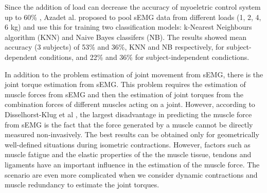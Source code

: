 \documentclass[letterpaper, 10 pt, conference]{ieeeconf}  %
\begin{document}
Since the addition of load can decrease the accuracy of myoeletric control system up to 60\% \cite{Al-Timemy6610859}, Azadet al. \cite{Azab8037374} proposed to pool sEMG data from different loads (1, 2, 4, 6 kg) and use this for training two classification models: k-Nearest Neighbours algorithm (KNN) and Naive Bayes classifers (NB). The results showed mean accuracy (3 subjects) of 53\% and 36\%, KNN and NB respectively, for subject-dependent conditions, and 22\% and 36\% for subject-independent condictions.

In addition to the problem estimation of joint movement from sEMG, there is the joint torque estimation from sEMG. This problem requires the estimation of muscle forces from sEMG and then the estimation of joint torques from the combination forces of different muscles acting on a joint. However, according to Disselhorst-Klug et al \cite{Disselhorst-Klug2009225}, the largest disadvantage in predicting the muscle force from sEMG is the fact that the force generated by a muscle cannot be directly measured non-invasively. The best results can be obtained only for geometrically well-defined situations during isometric contractions. However, factors such as muscle fatigue and the elastic properties of the the muscle tissue, tendons and ligaments have an important influence in the estimation of the muscle force. The scenario are even more complicated when we consider dynamic contractions and muscle redundancy to estimate the joint torques. 



\end{document}
